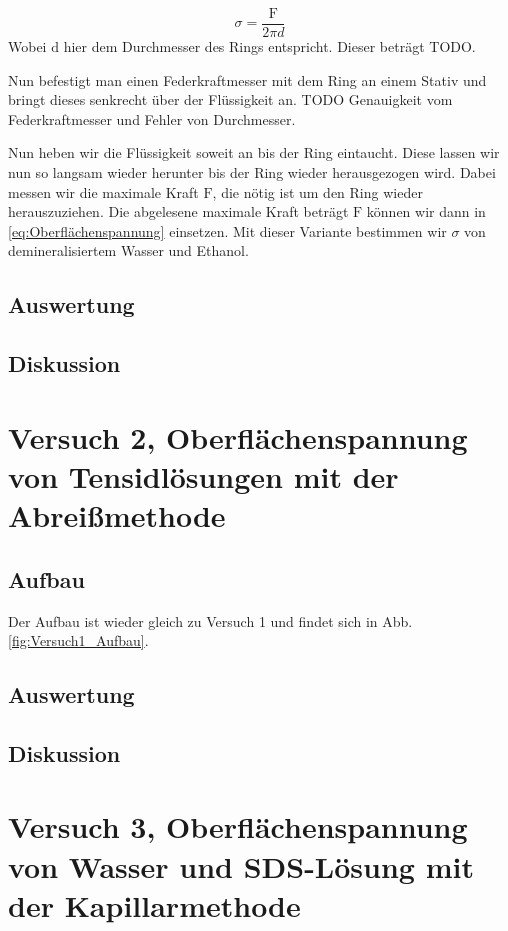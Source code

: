         \begin{equation}
            \sigma = \frac{\mathrm{F}}{2\pi d}
            \label{eq:Oberflächenspannung}
        \end{equation}
        Wobei $\mathrm{d}$ hier dem Durchmesser des Rings entspricht. Dieser beträgt TODO.
        
        Nun befestigt man einen Federkraftmesser mit dem Ring an einem Stativ und bringt dieses senkrecht über der Flüssigkeit an. TODO Genauigkeit vom Federkraftmesser und Fehler von Durchmesser. 

        \noindent Nun heben wir die Flüssigkeit soweit an bis der Ring eintaucht. Diese lassen wir nun so langsam wieder herunter bis der Ring wieder herausgezogen wird. Dabei messen wir die maximale Kraft $\mathrm{F}$, die nötig ist um den Ring wieder herauszuziehen. Die abgelesene maximale Kraft beträgt $\mathrm{F}$ können wir dann in \ref{eq:Oberflächenspannung} einsetzen. Mit dieser Variante bestimmen wir $\sigma$ von demineralisiertem Wasser und Ethanol.
        \subsection{Auswertung}
        \subsection{Diskussion}

        \section{Versuch 2, Oberflächenspannung von Tensidlösungen mit der Abreißmethode}

        \subsection{Aufbau}
        Der Aufbau ist wieder gleich zu Versuch 1 und findet sich in Abb. \ref{fig:Versuch1_Aufbau}. 

        \subsection{Auswertung}
        \subsection{Diskussion}

        \section{Versuch 3, Oberflächenspannung von Wasser und SDS-Lösung mit der Kapillarmethode}

